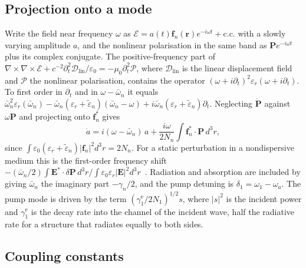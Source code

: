 \documentclass[9pt]{osa-supplemental-document}
\newcommand{\f}{\mathbf f}
\begin{document}
\subsection{Projection onto a mode}

Write the field near frequency $\omega$ as
$\mathcal E=a(t)\f_n(\mathbf r)e^{-i\omega t}+\mathrm{c.c.}$ with a slowly
varying amplitude $a$, and the nonlinear polarisation in the same band as
$\mathbf Pe^{-i\omega t}$ plus its complex conjugate.  The
positive-frequency part of
$\nabla\times\nabla\times\mathcal E+c^{-2}\partial_t^2\mathcal D_{\mathrm{lin}}/\varepsilon_0=-\mu_0\partial_t^2\mathcal P$,
where $\mathcal D_{\mathrm{lin}}$ is the linear displacement field and
$\mathcal P$ the nonlinear polarisation, contains the operator $(\omega+i\partial_t)^2\varepsilon_r(\omega+i\partial_t)$.
To first order in $\partial_t$ and in $\omega-\bar\omega_n$ it equals
$\bar\omega_n^2\varepsilon_r(\bar\omega_n)-\bar\omega_n(\varepsilon_r+\tilde\varepsilon_n)(\bar\omega_n-\omega)+i\bar\omega_n(\varepsilon_r+\tilde\varepsilon_n)\partial_t$.
Neglecting $\dot{\mathbf P}$ against $\omega\mathbf P$ and projecting onto
$\f_n^*$ gives
\begin{equation}
  \dot a=i(\omega-\bar\omega_n)\,a+\frac{i\omega}{2N_n}\int\f_n^*\cdot\mathbf P\,d^3r ,
  \label{eq:projection}
\end{equation}
since $\int\varepsilon_0(\varepsilon_r+\tilde\varepsilon_n)|\f_n|^2d^3r=2N_n$.
For a static perturbation in a nondispersive medium this is the
first-order frequency shift
$-(\bar\omega_n/2)\int\mathbf E^*\cdot\delta\mathbf P\,d^3r/\int\varepsilon_0\varepsilon_r|\mathbf E|^2d^3r$~\cite{johnson2002}.
Radiation and absorption are included by giving $\bar\omega_n$ the
imaginary part $-\gamma_n/2$, and the pump detuning is
$\delta_1=\omega_1-\omega_a$.  The pump mode is driven by the term
$(\gamma_1^{\mathrm e}/2N_1)^{1/2}s$, where $|s|^2$ is the incident power
and $\gamma_1^{\mathrm e}$ is
the decay rate into the channel of the incident wave, half the radiative
rate for a structure that radiates equally to both sides.

\subsection{Coupling constants}
\end{document}
